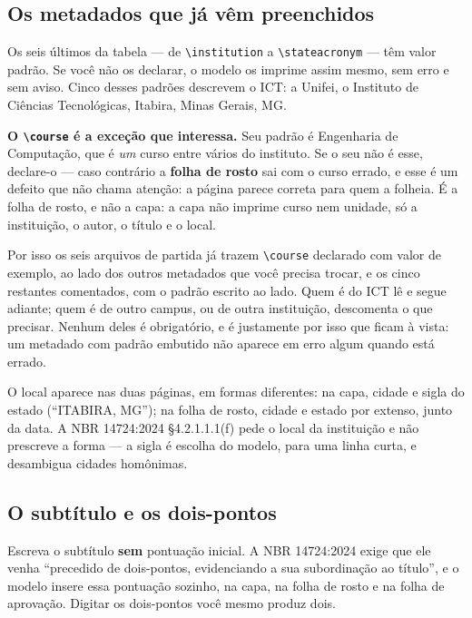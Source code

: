\subsection{Os metadados que já vêm preenchidos}\label{ssc:metadados-padrao}

Os seis últimos da tabela --- de \verb|\institution| a \verb|\stateacronym| --- têm valor padrão. Se
você não os declarar, o modelo os imprime assim mesmo, sem erro e sem aviso. Cinco desses padrões
descrevem o ICT: a Unifei, o Instituto de Ciências Tecnológicas, Itabira, Minas Gerais, MG.

\textbf{O \texttt{\textbackslash course} é a exceção que interessa.} Seu padrão é Engenharia de Computação, que é
\emph{um} curso entre vários do instituto. Se o seu não é esse, declare-o --- caso contrário a
\textbf{folha de rosto} sai com o curso errado, e esse é um defeito que não chama atenção: a página
parece correta para quem a folheia. É a folha de rosto, e não a capa: a capa não imprime curso nem
unidade, só a instituição, o autor, o título e o local.

Por isso os seis arquivos de partida já trazem \verb|\course| declarado com valor de exemplo, ao
lado dos outros metadados que você precisa trocar, e os cinco restantes comentados, com o padrão
escrito ao lado. Quem é do ICT lê e segue adiante; quem é de outro campus, ou de outra instituição,
descomenta o que precisar. Nenhum deles é obrigatório, e é justamente por isso que ficam à vista: um
metadado com padrão embutido não aparece em erro algum quando está errado.

O local aparece nas duas páginas, em formas diferentes: na capa, cidade e sigla do estado
(``ITABIRA, MG''); na folha de rosto, cidade e estado por extenso, junto da data. A NBR 14724:2024
§4.2.1.1.1(f) pede o local da instituição e não prescreve a forma --- a sigla é escolha do modelo,
para uma linha curta, e desambigua cidades homônimas.

\subsection{O subtítulo e os dois-pontos}\label{ssc:subtitulo}

Escreva o subtítulo \textbf{sem} pontuação inicial. A NBR 14724:2024 exige que ele venha ``precedido
de dois-pontos, evidenciando a sua subordinação ao título'', e o modelo insere essa pontuação
sozinho, na capa, na folha de rosto e na folha de aprovação. Digitar os dois-pontos você mesmo
produz dois.

